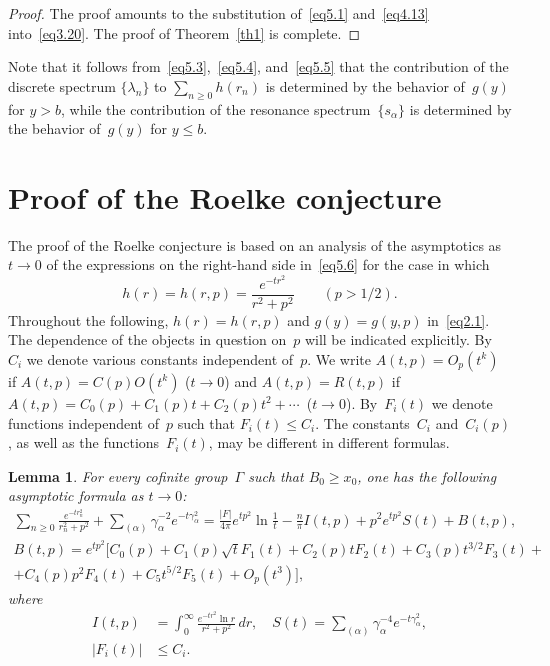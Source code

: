 \documentclass{amsart}
\theoremstyle{plain}
\newtheorem{lemma}{Lemma}
\theoremstyle{definition}
\numberwithin{equation}{section}
\begin{document}
\begin{proof}
The proof amounts to the substitution of~\eqref{eq5.1}
and~\eqref{eq4.13} into~\eqref{eq3.20}. The proof of
Theorem~\ref{th1} is complete.
\end{proof}

Note that it follows from~\eqref{eq5.3},~\eqref{eq5.4},
and~\eqref{eq5.5} that the contribution of the discrete spectrum
$\{\lambda_n\}$ to $\sum_{n \geqslant 0}h(r_n)$ is determined by
the behavior of~$g(y)$ for $y>b$, while the contribution of the
resonance spectrum~$\{s_\alpha\}$ is determined by the behavior
of~$g(y)$ for $y \leqslant b$.




\section{Proof of the Roelke conjecture}
\label{sec6}

The proof of the Roelke conjecture is based on an analysis of the
asymptotics as $t\to 0$ of the expressions on the right-hand side
in~\eqref{eq5.6} for the case in which
\begin{equation}
\label{eq6.1} h(r)=h(r,p)=\frac{e^{-tr^2}}{r^2+p^2}\qquad (p>1/2).
\end{equation}
Throughout the following, $h(r)=h(r,p)$ and $g(y)=g(y,p)$
in~\eqref{eq2.1}. The dependence of the objects in question on~$p$
will be indicated explicitly. By~$C_i$ we denote various constants
independent of~$p$. We write $A(t,p)=O_p(t^k)$ if
$A(t,p)=C(p)O(t^k)$ ($t\to 0$) and $A(t,p)=R(t,p)$ if
$A(t,p)=C_0(p)+C_1(p)t+C_2(p)t^2+\cdots$ \,($t\to 0$). By~$F_i(t)$
we denote functions independent of~$p$ such that $F_i(t)\leqslant
C_i$. The constants~$C_i$ and~$C_i(p)$, as well as the
functions~$F_i(t)$, may be different in different formulas.

\begin{lemma}
 \label{lem5}
For every cofinite group~$\Gamma$ such that $B_0\geqslant x_0$, one
has the following asymptotic formula as $t\to 0$\textup:
\begin{multline}\label{eq6.2}
\sum_{n\geqslant 0}\frac{e^{-tr_n^2}}{r_n^2+p^2}+
\sum_{(\alpha)}\gamma_\alpha^{-2}e^{-t\gamma_\alpha^2}=
\frac{|F|}{4\pi}e^{tp^2}\ln\frac{1}{t}-\frac{n}{\pi}I(t,p)+p^{2}e^{tp^2}S(t)+B(t,p), \\
B(t,p)= e^{tp^2}\bigl[C_{0}(p)+C_{1}(p)\sqrt{t}F_{1}(t)+C_{2}(p)tF_{2}(t)+C_{3}(p)t^{3/2}F_{3}(t)+\\
+C_{4}(p)p^{2}F_{4}(t)+C_{5}t^{5/2}F_{5}(t)+O_{p}(t^{3})\bigr],
\end{multline}
where
\begin{align}
\label{eq6.3}
I(t,p)&=\int_0^\infty\frac{e^{-tr^2}\ln r}{r^2+p^2}\,dr,\quad S(t)=\sum\limits_{(\alpha)}\gamma_{\alpha}^{-4}e^{-t\gamma_{\alpha}^{2}},
\\
\label{eq6.4}
\bigl|F_{i}(t)\bigr|&\leqslant C_{i}.
\end{align}
\end{lemma}
\end{document}
